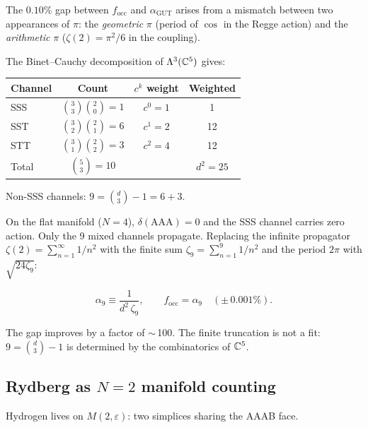 \begin{remark}
The $0.10\%$ gap between $f_\mathrm{occ}$ and $\alpha_\text{GUT}$ arises from a mismatch between two appearances of $\pi$: the \emph{geometric} $\pi$ (period of $\cos$ in the Regge action) and the \emph{arithmetic} $\pi$ ($\zeta(2) = \pi^2/6$ in the coupling).

\begin{theorem}
\label{thm:channel_count}
The Binet--Cauchy decomposition of $\Lambda^3(\mathbb{C}^5)$ gives:
\begin{center}
\begin{tabular}{lccc}
\hline
Channel & Count & $c^k$ weight & Weighted \\
\hline
SSS & $\binom{3}{3}\binom{2}{0} = 1$ & $c^0 = 1$ & 1 \\
SST & $\binom{3}{2}\binom{2}{1} = 6$ & $c^1 = 2$ & 12 \\
STT & $\binom{3}{1}\binom{2}{2} = 3$ & $c^2 = 4$ & 12 \\
\hline
Total & $\binom{5}{3} = 10$ & & $d^2 = 25$ \\
\hline
\end{tabular}
\end{center}
Non-SSS channels: $9 = \binom{d}{3} - 1 = 6 + 3$.
\end{theorem}

On the flat manifold ($N=4$), $\delta(\mathrm{AAA}) = 0$ and the SSS channel carries zero action.  Only the 9 mixed channels propagate.  Replacing the infinite propagator $\zeta(2) = \sum_{n=1}^\infty 1/n^2$ with the finite sum $\zeta_9 = \sum_{n=1}^9 1/n^2$ and the period $2\pi$ with $\sqrt{24\zeta_9}$:

\begin{equation}
\alpha_9 \equiv \frac{1}{d^2\,\zeta_9}, \qquad
f_\mathrm{occ} = \alpha_9 \quad (\pm\,0.001\%).
\end{equation}

The gap improves by a factor of $\sim$\,100.  The finite truncation is not a fit: $9 = \binom{d}{3} - 1$ is determined by the combinatorics of $\mathbb{C}^5$.

\subsection{Rydberg as $N=2$ manifold counting}
\label{sec:rydberg_N2}

Hydrogen lives on $M(2,\varepsilon)$: two simplices sharing the AAAB face.


\end{remark}
